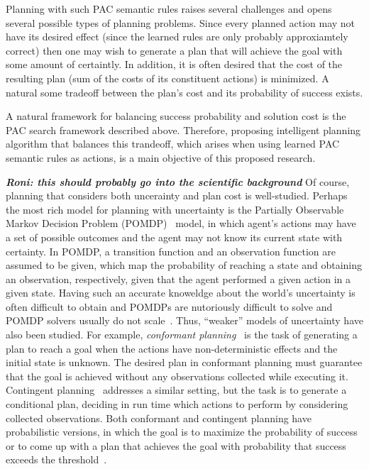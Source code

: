 \documentclass[12pt]{article}
\newcommand{\note}[1]{\textbf{\textit{#1}}}
\begin{document}
Planning with such PAC semantic rules raises several challenges and opens several possible types of planning problems.
Since every planned action may not have its desired effect (since the learned rules are only probably approxiamtely correct)
then one may wish to generate a plan that will achieve the goal with some amount of certaintly. In addition, it is often desired that the cost of the resulting plan (sum of the costs of its constituent actions) is minimized. A natural some tradeoff between the plan's cost  and its probability of success exists. 

A natural framework for balancing success probability and solution cost 
is the PAC search framework described above. 
Therefore, proposing intelligent planning algorithm that balances this trandeoff, which arises when using learned PAC semantic rules as actions, is a main objective of this proposed research. 





\note{Roni: this should probably go into the scientific background}
Of course, planning that considers both uncerainty and plan cost is well-studied. Perhaps the most rich model for planning with uncertainty is
the Partially Observable Markov Decision Problem (POMDP)~\cite{cassandra1994acting}
model, in which agent's actions may have a set of possible outcomes
and the agent may not know its current state with certainty. 
In POMDP, a transition function and an observation function are assumed to be given, which map the probability of reaching a state and obtaining an observation, respectively, given that the agent performed a given action in a given state. Having such an accurate knoweldge about the world's uncertainty is often difficult to obtain and POMDPs are nutoriously difficult to solve and POMDP solvers usually do not scale~\cite{todo}. 
Thus, ``weaker'' models of uncertainty have also been studied. 
For example, {\em conformant planning}~\cite{todo} is the task of generating a plan to reach a goal when the actions have non-deterministic effects
and the initial state is unknown. The desired plan in conformant planning must guarantee that the goal is achieved without any observations collected while executing it. Contingent planning~\cite{} addresses a similar setting, but the task is to generate a conditional plan, deciding in run time which actions to perform by considering collected observations. 
Both conformant and contingent planning have probabilistic versions,
in which the goal is to maximize the probability of success~\cite{blum1999probabilistic,taig2015compilation,markou2016cost} 
or to come up with a plan that achieves the goal with probability that success exceeds the threshold~\cite{kushmerick1995algorithm}.
\end{document}
